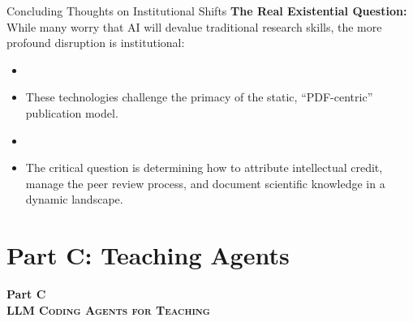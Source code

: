 \documentclass[xcolor=x11names,compress,9pt]{beamer}
\renewcommand{\(}{\begin{columns}}
\renewcommand{\)}{\end{columns}}
\newcommand{\<}[1]{\begin{column}{#1}}
\renewcommand{\>}{\end{column}}
\begin{document}
\begin{frame}{Concluding Thoughts on Institutional Shifts}
    \textbf{The Real Existential Question:} \\ \vspace{0.2cm}
    While many worry that AI will devalue traditional research skills, the more profound disruption is institutional:
    \begin{itemize}
        \item []
        \item These technologies challenge the primacy of the static, ``PDF-centric'' publication model.
        \item []
        \item The critical question is determining how to attribute intellectual credit, manage the peer review process, and document scientific knowledge in a dynamic landscape.
    \end{itemize}
\end{frame}

\section{Part C: Teaching Agents}

\begin{frame}
    \centering
    \vfill
    \Huge\bfseries Part C \\ 
    \vspace{0.4cm}
    \large\scshape LLM Coding Agents for Teaching
    \vfill
\end{frame}
\end{document}
